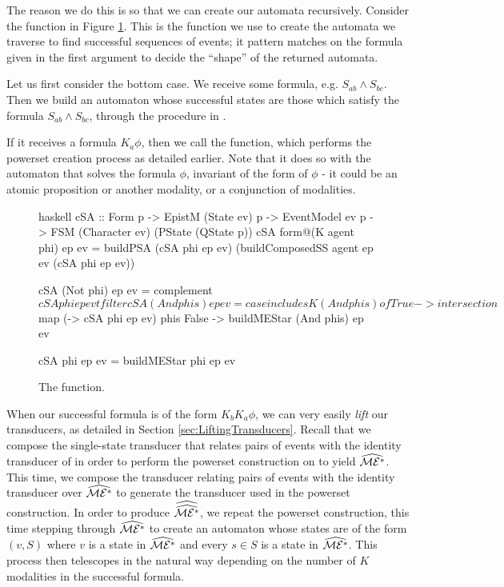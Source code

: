 \documentclass[10pt, a4paper]{report}
\begin{document}
The reason we do this is so that we can create our automata recursively.
Consider the function in Figure \ref{fig:createSolvingAutomata}. This is the
function we use to create the automata we traverse to find successful sequences
of events; it pattern matches on the formula given in the first argument to
decide the ``shape'' of the returned automata.

Let us first consider the bottom case. We receive some formula, e.g. $S_{ab}
\land S_{bc}$. Then we build an automaton \mestar whose successful states are
those which satisfy the formula $S_{ab} \land S_{bc}$, through the procedure in
. 

If it receives a formula $K_a \phi$, then we call the 
function, which performs the powerset creation process as detailed earlier. Note
that it does so with the automaton that solves the formula $\phi$, invariant of
the form of $\phi$ - it could be an atomic proposition or another modality, or a
conjunction of modalities. 

\begin{figure}[h]
  \centering
  \begin{cminted}{haskell}
    cSA :: Form p -> EpistM (State ev) p -> EventModel ev p
           -> FSM (Character ev) (PState (QState p))
    cSA form@(K agent phi) ep ev
      = buildPSA 
                 (cSA phi ep ev) 
                 (buildComposedSS agent ep ev (cSA phi ep ev)) 

    cSA (Not phi) ep ev = complement $ cSA phi ep ev tfilter

    cSA (And phis) ep ev = case includesK (And phis) of
      True  -> intersection $ map (\phi -> cSA phi ep ev) phis
      False -> buildMEStar (And phis) ep ev

    cSA phi ep ev = buildMEStar phi ep ev
  \end{cminted}
  \caption{The  function.}
  \label{fig:createSolvingAutomata}
\end{figure}

When our successful formula is of the form $K_b K_a \phi$, we can very easily
\emph{lift} our transducers, as detailed in Section
\ref{sec:LiftingTransducers}. Recall that we compose the single-state transducer
that relates pairs of events with the identity transducer of \mestar in order to
perform the powerset construction on \mestar to yield $\widehat{\mathcal{ME^\ast}}$. This
time, we compose the transducer relating pairs of events with the identity
transducer over $\widehat{\mathcal{ME^\ast}}$ to generate the transducer used in the
powerset construction. In order to produce $\widehat{\widehat{\mathcal{ME^\ast}}}$, we repeat
the powerset construction, this time stepping through $\widehat{\mathcal{ME^\ast}}$ to
create an automaton whose states are of the form $(v, S)$ where $v$ is a state in
$\widehat{\mathcal{ME^\ast}}$ and every $s \in S$ is a state in $\widehat{\mathcal{ME^\ast}}$. This
process then telescopes in the natural way depending on the number of $K$
modalities in the successful formula.
\end{document}
